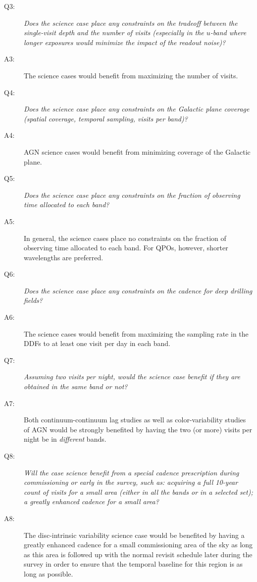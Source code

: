 \begin{description}
\item[Q3:] {\it Does the science case place any constraints on the
tradeoff between the single-visit depth and the number of visits
(especially in the $u$-band where longer exposures would minimize the
impact of the readout noise)?}

\item[A3:] The science cases would benefit from maximizing the number of visits.

\item[Q4:] {\it Does the science case place any constraints on the
Galactic plane coverage (spatial coverage, temporal sampling, visits per
band)?}

\item[A4:] AGN science cases would benefit from minimizing coverage of
the Galactic plane.

\item[Q5:] {\it Does the science case place any constraints on the
fraction of observing time allocated to each band?}

\item[A5:] In general, the science cases place no constraints on
the fraction of observing time allocated to each band.
For QPOs, however, shorter wavelengths are preferred.

\item[Q6:] {\it Does the science case place any constraints on the
cadence for deep drilling fields?}

\item[A6:] The science cases would benefit from maximizing the sampling
rate in the DDFs to at least one visit per day in each band.

\item[Q7:] {\it Assuming two visits per night, would the science case
benefit if they are obtained in the same band or not?}

\item[A7:] Both continuum-continuum lag studies as well as color-variability studies
of AGN would be strongly benefited by having the two (or more) visits per night be in
\emph{different} bands.

\item[Q8:] {\it Will the case science benefit from a special cadence
prescription during commissioning or early in the survey, such as:
acquiring a full 10-year count of visits for a small area (either in all
the bands or in a  selected set); a greatly enhanced cadence for a small
area?}

\item[A8:] The disc-intrinsic variability science case would be benefited by having a
greatly enhanced cadence for a small commissioning area of the sky as long as this area
is followed up with the normal revisit schedule later during the survey in order to
ensure that the temporal baseline for this region is as long as possible.


\end{description}

